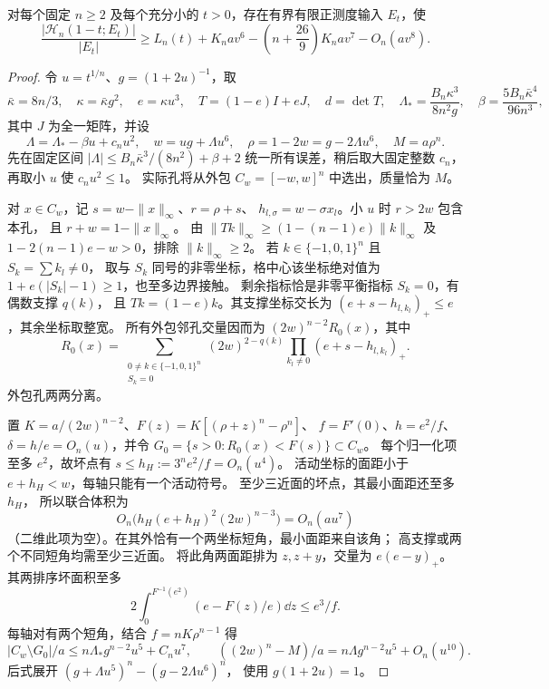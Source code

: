 \begin{proposition}[七阶有限构造]\label{seventh:lower}
对每个固定 \(n\ge2\) 及每个充分小的 \(t>0\)，存在有界有限正测度输入 \(E_t\)，使
\[
 \frac{|\mathcal H_n(1-t;E_t)|}{|E_t|}
 \ge L_n(t)+K_nav^6-\left(n+\frac{26}{9}\right)K_nav^7-O_n(av^8).
\]
\end{proposition}
\begin{proof}
令 \(u=t^{1/n}\)、\(g=(1+2u)^{-1}\)，取
\[
 \bar\kappa=8n/3,\quad \kappa=\bar\kappa g^2,\quad e=\kappa u^3,\quad
 T=(1-e)I+eJ,\quad d=\det T,\quad
 \Lambda_*=\frac{B_n\kappa^3}{8n^2g},\quad
 \beta=\frac{5B_n\bar\kappa^4}{96n^3},
\]
其中 \(J\) 为全一矩阵，并设
\begin{equation}\label{seventh:lower-parameters}
 \Lambda=\Lambda_*-\beta u+c_nu^2,\quad
 w=ug+\Lambda u^6,\quad \rho=1-2w=g-2\Lambda u^6,\quad M=a\rho^n.
\end{equation}
先在固定区间 \(|\Lambda|\le B_n\bar\kappa^3/(8n^2)+\beta+2\)
统一所有误差，稍后取大固定整数 \(c_n\)，再取小 \(u\) 使 \(c_nu^2\le1\)。
实际孔将从外包 \(C_w=[-w,w]^n\) 中选出，质量恰为 \(M\)。

对 \(x\in C_w\)，记 \(s=w-\|x\|_\infty\)、\(r=\rho+s\)、
\(h_{l,\sigma}=w-\sigma x_l\)。小 \(u\) 时 \(r>2w\) 包含本孔，
且 \(r+w=1-\|x\|_\infty\)。
由 \(\|Tk\|_\infty\ge(1-(n-1)e)\|k\|_\infty\) 及
\(1-2(n-1)e-w>0\)，排除 \(\|k\|_\infty\ge2\)。
若 \(k\in\{-1,0,1\}^n\) 且 \(S_k=\sum k_l\ne0\)，
取与 \(S_k\) 同号的非零坐标，格中心该坐标绝对值为
\(1+e(|S_k|-1)\ge1\)，也至多边界接触。
剩余指标恰是非零平衡指标 \(S_k=0\)，有偶数支撑 \(q(k)\)，
且 \(Tk=(1-e)k\)。其支撑坐标交长为
\((e+s-h_{l,k_l})_+\le e\)，其余坐标取整宽。
所有外包邻孔交量因而为 \((2w)^{n-2}R_0(x)\)，其中
\begin{equation}\label{seventh:balanced-list}
 R_0(x)=\sum_{\substack{0\ne k\in\{-1,0,1\}^n\\S_k=0}}
 (2w)^{2-q(k)}\prod_{k_l\ne0}(e+s-h_{l,k_l})_+ .
\end{equation}
外包孔两两分离。

置 \(K=a/(2w)^{n-2}\)、\(F(z)=K[(\rho+z)^n-\rho^n]\)、
\(f=F'(0)\)、\(h=e^2/f\)、\(\delta=h/e=O_n(u)\)，并令
\(G_0=\{s>0:R_0(x)<F(s)\}\subset C_w\)。
每个归一化项至多 \(e^2\)，故坏点有
\(s\le h_H:=3^ne^2/f=O_n(u^4)\)。
活动坐标的面距小于 \(e+h_H<w\)，每轴只能有一个活动符号。
至少三近面的坏点，其最小面距还至多 \(h_H\)，
所以联合体积为
\[
 O_n\bigl(h_H(e+h_H)^2(2w)^{n-3}\bigr)=O_n(au^7)
\]
（二维此项为空）。在其外恰有一个两坐标短角，最小面距来自该角；
高支撑或两个不同短角均需至少三近面。
将此角两面距排为 \(z,z+y\)，交量为 \(e(e-y)_+\)。
其两排序坏面积至多
\[
 2\int_0^{F^{-1}(e^2)}(e-F(z)/e)\dd z\le e^3/f.
\]
每轴对有两个短角，结合
\(f=nK\rho^{n-1}\) 得
\begin{equation}\label{seventh:lower-budget}
 |C_w\setminus G_0|/a\le n\Lambda_*g^{n-2}u^5+C_nu^7,\qquad
 ((2w)^n-M)/a=n\Lambda g^{n-2}u^5+O_n(u^{10}).
\end{equation}
后式展开 \((g+\Lambda u^5)^n-(g-2\Lambda u^6)^n\)，
使用 \(g(1+2u)=1\)。


\end{proof}
